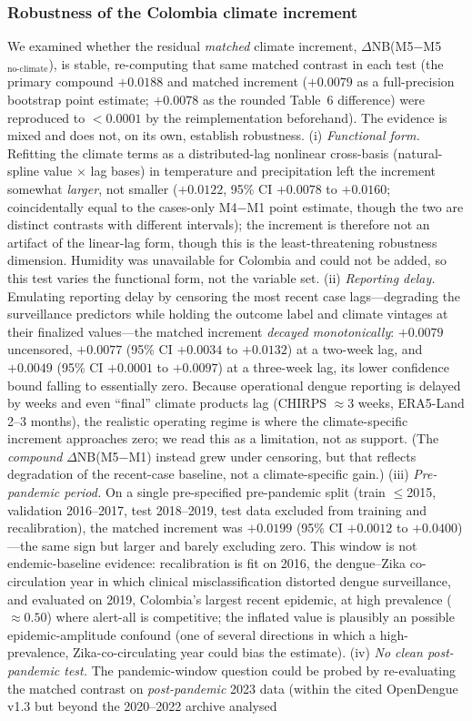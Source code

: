 \documentclass[11pt,a4paper]{article}
\begin{document}
\subsubsection*{Robustness of the Colombia climate increment}
We examined whether the residual \emph{matched} climate increment, $\Delta$NB(M5$-$M5$_{\text{no-climate}}$), is stable, re-computing that same matched contrast in each test (the primary compound $+0.0188$ and matched increment ($+0.0079$ as a full-precision bootstrap point estimate; $+0.0078$ as the rounded Table~6 difference) were reproduced to $<0.0001$ by the reimplementation beforehand). The evidence is mixed and does not, on its own, establish robustness. (i) \emph{Functional form.} Refitting the climate terms as a distributed-lag nonlinear cross-basis (natural-spline value $\times$ lag bases) in temperature and precipitation left the increment somewhat \emph{larger}, not smaller ($+0.0122$, 95\% CI $+0.0078$ to $+0.0160$; coincidentally equal to the cases-only M4$-$M1 point estimate, though the two are distinct contrasts with different intervals); the increment is therefore not an artifact of the linear-lag form, though this is the least-threatening robustness dimension. Humidity was unavailable for Colombia and could not be added, so this test varies the functional form, not the variable set. (ii) \emph{Reporting delay.} Emulating reporting delay by censoring the most recent case lags---degrading the surveillance predictors while holding the outcome label and climate vintages at their finalized values---the matched increment \emph{decayed monotonically}: $+0.0079$ uncensored, $+0.0077$ (95\% CI $+0.0034$ to $+0.0132$) at a two-week lag, and $+0.0049$ (95\% CI $+0.0001$ to $+0.0097$) at a three-week lag, its lower confidence bound falling to essentially zero. Because operational dengue reporting is delayed by weeks and even ``final'' climate products lag (CHIRPS $\approx$3 weeks, ERA5-Land 2--3 months), the realistic operating regime is where the climate-specific increment approaches zero; we read this as a limitation, not as support. (The \emph{compound} $\Delta$NB(M5$-$M1) instead grew under censoring, but that reflects degradation of the recent-case baseline, not a climate-specific gain.) (iii) \emph{Pre-pandemic period.} On a single pre-specified pre-pandemic split (train $\le$2015, validation 2016--2017, test 2018--2019, test data excluded from training and recalibration), the matched increment was $+0.0199$ (95\% CI $+0.0012$ to $+0.0400$)---the same sign but larger and barely excluding zero. This window is not endemic-baseline evidence: recalibration is fit on 2016, the dengue--Zika co-circulation year in which clinical misclassification distorted dengue surveillance, and evaluated on 2019, Colombia's largest recent epidemic, at high prevalence ($\approx0.50$) where alert-all is competitive; the inflated value is plausibly an possible epidemic-amplitude confound (one of several directions in which a high-prevalence, Zika-co-circulating year could bias the estimate). (iv) \emph{No clean post-pandemic test.} The pandemic-window question could be probed by re-evaluating the matched contrast on \emph{post-pandemic} 2023 data (within the cited OpenDengue v1.3 but beyond the 2020--2022 archive analysed 
\end{document}
